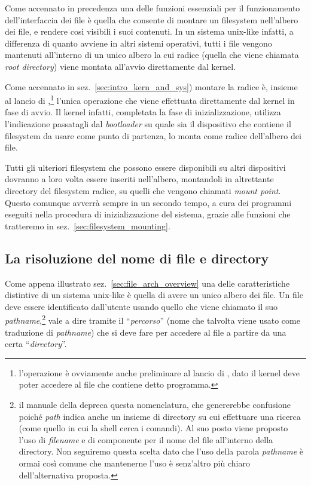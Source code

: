 
Come accennato in precedenza una delle funzioni essenziali per il
funzionamento dell'interfaccia dei file è quella che consente di montare un
filesystem nell'albero dei file, e rendere così visibili i suoi contenuti. In
un sistema unix-like infatti, a differenza di quanto avviene in altri sistemi
operativi, tutti i file vengono mantenuti all'interno di un unico albero la
cui radice (quella che viene chiamata \textit{root directory}) viene montata
all'avvio direttamente dal kernel.

Come accennato in sez.~\ref{sec:intro_kern_and_sys}) montare la radice è,
insieme al lancio di ,\footnote{l'operazione è ovviamente anche
  preliminare al lancio di , dato il kernel deve poter accedere al
  file che contiene detto programma.} l'unica operazione che viene effettuata
direttamente dal kernel in fase di avvio. Il kernel infatti, completata la
fase di inizializzazione, utilizza l'indicazione passatagli dal
\textit{bootloader} su quale sia il dispositivo che contiene il filesystem da
usare come punto di partenza, lo monta come radice dell'albero dei file.

Tutti gli ulteriori filesystem che possono essere disponibili su altri
dispositivi dovranno a loro volta essere inseriti nell'albero, montandoli in
altrettante directory del filesystem radice, su quelli che vengono chiamati
\textit{mount point}.  Questo comunque avverrà sempre in un secondo tempo, a
cura dei programmi eseguiti nella procedura di inizializzazione del sistema,
grazie alle funzioni che tratteremo in sez.~\ref{sec:filesystem_mounting}.


\subsection{La risoluzione del nome di file e directory}
\label{sec:file_pathname}


Come appena illustrato sez.~\ref{sec:file_arch_overview} una delle
caratteristiche distintive di un sistema unix-like è quella di avere un unico
albero dei file. Un file deve essere identificato dall'utente usando quello
che viene chiamato il suo \textit{pathname},\footnote{il manuale della
   depreca questa nomenclatura, che genererebbe confusione poiché
  \textit{path} indica anche un insieme di directory su cui effettuare una
  ricerca (come quello in cui la shell cerca i comandi). Al suo posto viene
  proposto l'uso di \textit{filename} e di componente per il nome del file
  all'interno della directory. Non seguiremo questa scelta dato che l'uso
  della parola \textit{pathname} è ormai così comune che mantenerne l'uso è
  senz'altro più chiaro dell'alternativa proposta.} vale a dire tramite il
``\textsl{percorso}'' (nome che talvolta viene usato come traduzione di
\textit{pathname}) che si deve fare per accedere al file a partire da una
certa ``\textit{directory}''.

